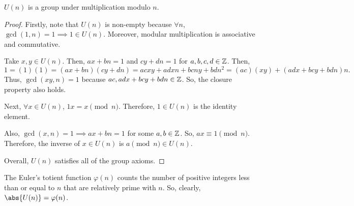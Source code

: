 \documentclass[11pt]{penrose}
\begin{document}
\begin{nthm}
    $U(n)$ is a group under multiplication modulo $n$.
\end{nthm}
\begin{proof}
    Firstly, note that $U(n)$ is non-empty because $\forall n$, $\gcd(1,n) = 1 \implies 1 \in U(n)$. Moreover, modular multiplication is associative and commutative.

    Take $x,y \in U(n)$. Then, $ax+bn = 1$ and $cy + dn = 1$ for $a,b,c,d \in \mathbb{Z}$. Then,
    \begin{equation*}
        1
        = (1)(1)
        = (ax+bn)(cy+dn)
        = acxy + adxn + bcny + bdn^{2}
        = (ac)(xy) + (adx + bcy + bdn)n.
    \end{equation*}
    Thus, $\gcd(xy, n) = 1$ because $ac, adx + bcy + bdn \in \mathbb{Z}$. So, the closure property also holds.

    Next, $\forall x \in U(n)$, $1 x = x \pmod n$. Therefore, $1 \in U(n)$ is the identity element.

    Also, $\gcd(x,n) = 1 \implies ax + bn = 1$ for some $a, b \in \mathbb{Z}$. So, $ax \equiv 1 \pmod n$. Therefore, the inverse of $x \in U(n)$ is $a \pmod n \in U(n)$.


    Overall, $U(n)$ satisfies all of the group axioms.
\end{proof}

\begin{remark}
    The Euler's totient function $\varphi(n)$ counts the number of positive integers less than or equal to $n$ that are relatively prime with $n$. So, clearly, $\abs{U(n)} = \varphi(n)$.
\end{remark}
\end{document}
